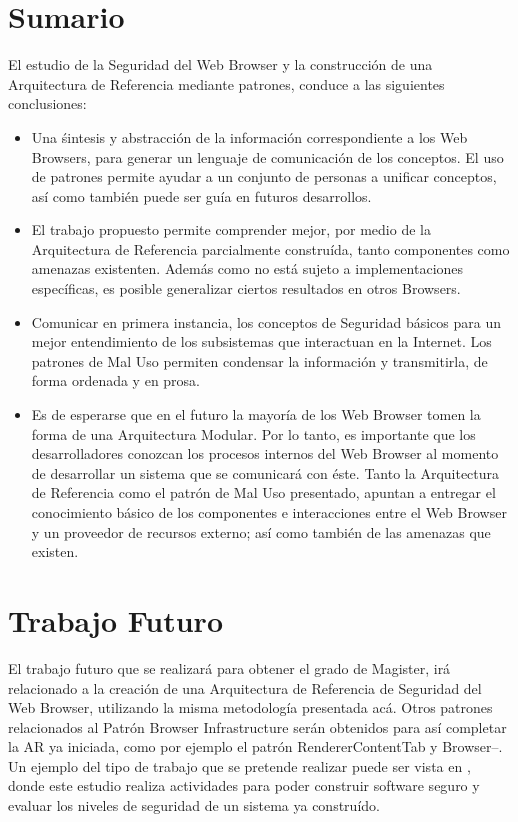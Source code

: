 \section{Sumario}
El estudio de la Seguridad del Web Browser y la construcción de una Arquitectura de Referencia mediante patrones, conduce a las siguientes conclusiones:
\begin{itemize}
	\item Una śintesis y abstracción de la información correspondiente a los Web Browsers, para generar un lenguaje de comunicación de los conceptos. El uso de patrones permite ayudar a un conjunto de personas a unificar conceptos, así como también puede ser guía en futuros desarrollos.
	\item El trabajo propuesto permite comprender mejor, por medio de la Arquitectura de Referencia parcialmente construída, tanto componentes como amenazas existenten. Además como no está sujeto a implementaciones específicas, es posible generalizar ciertos resultados en otros Browsers.
	\item Comunicar en primera instancia, los conceptos de Seguridad básicos para un mejor entendimiento de los subsistemas que interactuan en la Internet. Los patrones de Mal Uso permiten condensar la información y transmitirla, de forma ordenada y en prosa.
	\item Es de esperarse que en el futuro la mayoría de los Web Browser tomen la forma de una Arquitectura Modular. Por lo tanto, es importante que los desarrolladores conozcan los procesos internos del Web Browser al momento de desarrollar un sistema que se comunicará con éste. Tanto la Arquitectura de Referencia como el patrón de Mal Uso presentado, apuntan a entregar el conocimiento básico de los componentes e interacciones entre el Web Browser y un proveedor de recursos externo; así como también de las amenazas que existen.
	
\end{itemize}


\section{Trabajo Futuro}
El trabajo futuro que se realizará para obtener el grado de Magister, irá relacionado a la creación de una Arquitectura de Referencia de Seguridad del Web Browser, utilizando la misma metodología presentada acá. Otros patrones relacionados al Patrón Browser Infrastructure serán obtenidos para así completar la AR ya iniciada, como por ejemplo el patrón RendererContentTab y Browser--. Un ejemplo del tipo de trabajo que se pretende realizar puede ser vista en \cite{fernandez2014security}, donde este estudio realiza actividades para poder construir software seguro y evaluar los niveles de seguridad de un sistema ya construído.

